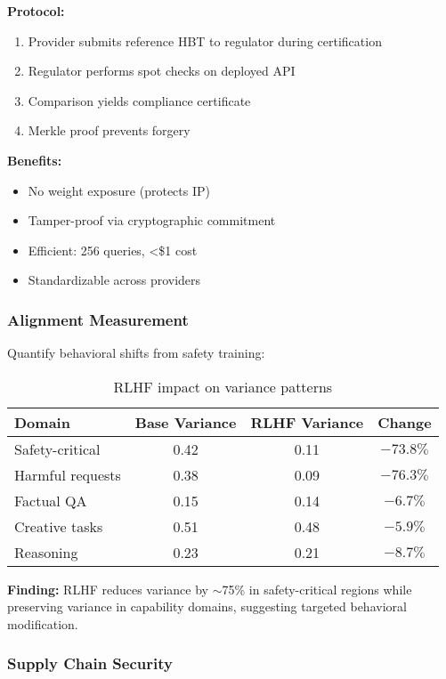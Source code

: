 \documentclass[11pt,a4paper]{article}
\begin{document}
\textbf{Protocol:}
\begin{enumerate}
\item Provider submits reference HBT to regulator during certification
\item Regulator performs spot checks on deployed API
\item Comparison yields compliance certificate
\item Merkle proof prevents forgery
\end{enumerate}

\textbf{Benefits:}
\begin{itemize}
\item No weight exposure (protects IP)
\item Tamper-proof via cryptographic commitment
\item Efficient: 256 queries, \textless\$1 cost
\item Standardizable across providers
\end{itemize}

\subsubsection{Alignment Measurement}

Quantify behavioral shifts from safety training:

\begin{table}[h]
\centering
\caption{RLHF impact on variance patterns}
\label{tab:rlhf}
\begin{tabular}{lccc}
\toprule
Domain & Base Variance & RLHF Variance & Change \\
\midrule
Safety-critical & 0.42 & 0.11 & $-73.8\%$ \\
Harmful requests & 0.38 & 0.09 & $-76.3\%$ \\
Factual QA & 0.15 & 0.14 & $-6.7\%$ \\
Creative tasks & 0.51 & 0.48 & $-5.9\%$ \\
Reasoning & 0.23 & 0.21 & $-8.7\%$ \\
\bottomrule
\end{tabular}
\end{table}

\textbf{Finding:} RLHF reduces variance by $\sim$75\% in safety-critical regions while preserving variance in capability domains, suggesting targeted behavioral modification.

\subsubsection{Supply Chain Security}
\end{document}
